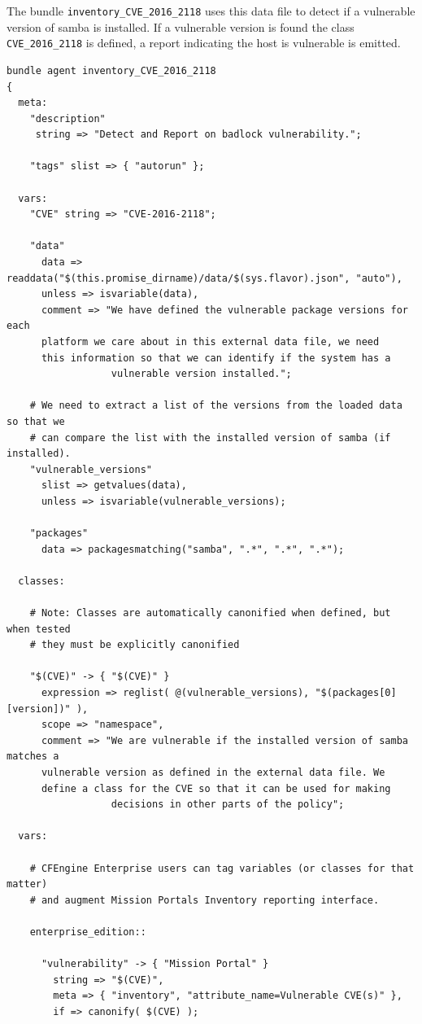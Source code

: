 \documentclass[11pt]{article}
\begin{document}
The bundle \texttt{inventory\_CVE\_2016\_2118} uses this data file to detect if a
vulnerable version of samba is installed. If a vulnerable version is found the
class \texttt{CVE\_2016\_2118} is defined, a report indicating the host is vulnerable is
emitted.

\begin{verbatim}
bundle agent inventory_CVE_2016_2118
{
  meta:
    "description"
     string => "Detect and Report on badlock vulnerability.";

    "tags" slist => { "autorun" };

  vars:
    "CVE" string => "CVE-2016-2118";

    "data"
      data => readdata("$(this.promise_dirname)/data/$(sys.flavor).json", "auto"),
      unless => isvariable(data),
      comment => "We have defined the vulnerable package versions for each
      platform we care about in this external data file, we need
      this information so that we can identify if the system has a
                  vulnerable version installed.";

    # We need to extract a list of the versions from the loaded data so that we
    # can compare the list with the installed version of samba (if installed).
    "vulnerable_versions"
      slist => getvalues(data),
      unless => isvariable(vulnerable_versions);

    "packages"
      data => packagesmatching("samba", ".*", ".*", ".*");

  classes:

    # Note: Classes are automatically canonified when defined, but when tested
    # they must be explicitly canonified

    "$(CVE)" -> { "$(CVE)" }
      expression => reglist( @(vulnerable_versions), "$(packages[0][version])" ),
      scope => "namespace",
      comment => "We are vulnerable if the installed version of samba matches a
      vulnerable version as defined in the external data file. We
      define a class for the CVE so that it can be used for making
                  decisions in other parts of the policy";

  vars:

    # CFEngine Enterprise users can tag variables (or classes for that matter)
    # and augment Mission Portals Inventory reporting interface.

    enterprise_edition::

      "vulnerability" -> { "Mission Portal" }
        string => "$(CVE)",
        meta => { "inventory", "attribute_name=Vulnerable CVE(s)" },
        if => canonify( $(CVE) );


\end{verbatim}
\end{document}
